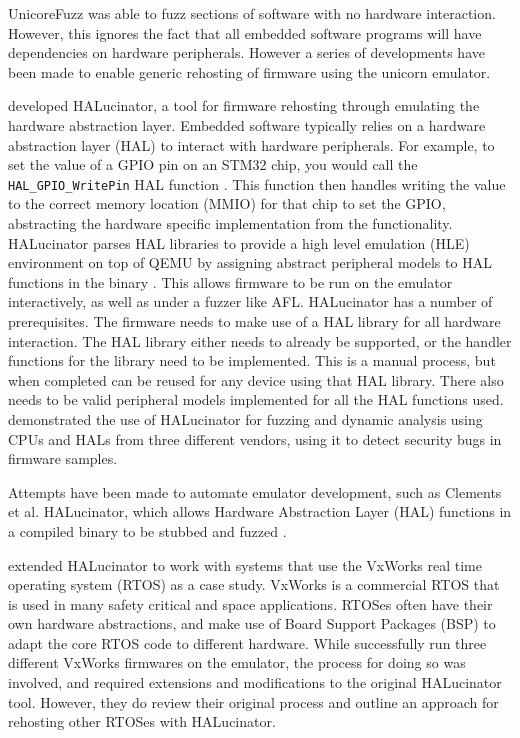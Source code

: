 \documentclass[../report.tex]{subfiles}
\begin{document}
UnicoreFuzz was able to fuzz sections of software with no hardware interaction.
However, this ignores the fact that all embedded software programs will have
dependencies on hardware peripherals. However a series of developments have
been made to enable generic rehosting of firmware using the unicorn emulator.

\citet{HALucinator_2020} developed HALucinator, a tool for firmware rehosting
through emulating the hardware abstraction layer. Embedded software typically
relies on a hardware abstraction layer (HAL) to interact with hardware
peripherals. For example, to set the value of a GPIO pin on an STM32 chip, you
would call the \lstinline{HAL_GPIO_WritePin} HAL function \citep{stm32hal}.
This function then handles writing the value to the correct memory location
(MMIO) for that chip to set the GPIO, abstracting the hardware specific
implementation from the functionality. HALucinator parses HAL libraries to
provide a high level emulation (HLE) environment on top of QEMU by assigning
abstract peripheral models to HAL functions in the binary
\citep{HALucinator_2020}. This allows firmware to be run on the emulator
interactively, as well as under a fuzzer like AFL. HALucinator has a number of
prerequisites. The firmware needs to make use of a HAL library for all hardware
interaction. The HAL library either needs to already be supported, or the
handler functions for the library need to be implemented. This is a manual
process, but when completed can be reused for any device using that HAL
library. There also needs to be valid peripheral models implemented for all the
HAL functions used. \citet{HALucinator_2020} demonstrated the use of
HALucinator for fuzzing and dynamic analysis using CPUs and HALs from three
different vendors, using it to detect security bugs in firmware samples.

Attempts have been made to automate emulator development, such as Clements et
al. HALucinator, which allows Hardware Abstraction Layer (HAL) functions in a
compiled binary to be stubbed and fuzzed \citep{Clements_2021}.

\citet{Clements_2021} extended HALucinator to work with systems that use the
VxWorks real time operating system (RTOS) as a case study. VxWorks is a
commercial RTOS that is used in many safety critical and space applications.
RTOSes often have their own hardware abstractions, and make use of Board
Support Packages (BSP) to adapt the core RTOS code to different hardware.
While \citet{Clements_2021} successfully run three different VxWorks firmwares
on the emulator, the process for doing so was involved, and required extensions
and modifications to the original HALucinator tool. However, they do review
their original process and outline an approach for rehosting other RTOSes with
HALucinator.
\end{document}
